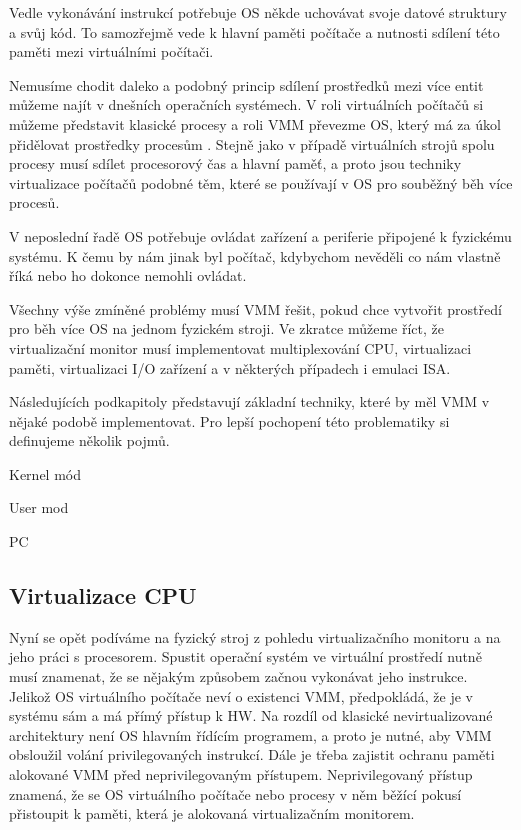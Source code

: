 Vedle vykonávání instrukcí potřebuje OS někde uchovávat svoje datové struktury a svůj kód. To samozřejmě vede k hlavní paměti počítače a nutnosti sdílení této paměti mezi virtuálními počítači.

Nemusíme chodit daleko a podobný princip sdílení prostředků mezi více entit můžeme najít v dnešních operačních systémech. V roli virtuálních počítačů si můžeme představit klasické procesy a roli VMM převezme OS, který má za úkol
přidělovat prostředky procesům \cite{virt1}. Stejně jako v případě virtuálních strojů spolu procesy musí sdílet procesorový čas a hlavní paměť, a proto jsou techniky virtualizace počítačů podobné těm, které se používají v OS pro 
souběžný běh více procesů.

V neposlední řadě OS potřebuje ovládat zařízení a periferie připojené k fyzickému systému. K čemu by nám jinak byl počítač, kdybychom nevěděli co nám vlastně říká nebo ho dokonce nemohli ovládat. 

Všechny výše zmíněné problémy musí VMM řešit, pokud chce vytvořit prostředí pro běh více OS na jednom fyzickém stroji. Ve zkratce můžeme říct, že virtualizační monitor musí implementovat multiplexování CPU, virtualizaci paměti,
virtualizaci I/O zařízení a v některých případech i emulaci ISA.

Následujících podkapitoly představují základní techniky, které by měl VMM v nějaké podobě implementovat. Pro lepší pochopení této problematiky si definujeme několik pojmů.

\begin{definition}
Kernel mód
\end{definition}

\begin{definition}
User mod
\end{definition}

\begin{definition}
PC
\end{definition}

\subsection{Virtualizace CPU}

Nyní se opět podíváme na fyzický stroj z pohledu virtualizačního monitoru a na jeho práci s procesorem. Spustit operační systém ve virtuální prostředí nutně musí znamenat, že se nějakým způsobem začnou vykonávat jeho instrukce.
Jelikož OS virtuálního počítače neví o existenci VMM, předpokládá, že je v systému sám a má přímý přístup k HW. Na rozdíl od klasické nevirtualizované architektury není OS hlavním řídícím programem, a proto je nutné, aby VMM obsloužil
volání privilegovaných instrukcí. Dále je třeba zajistit ochranu paměti alokované VMM před neprivilegovaným přístupem. Neprivilegovaný přístup znamená, že se OS virtuálního počítače nebo procesy v něm běžící pokusí přistoupit k paměti, 
která je alokovaná virtualizačním monitorem.

